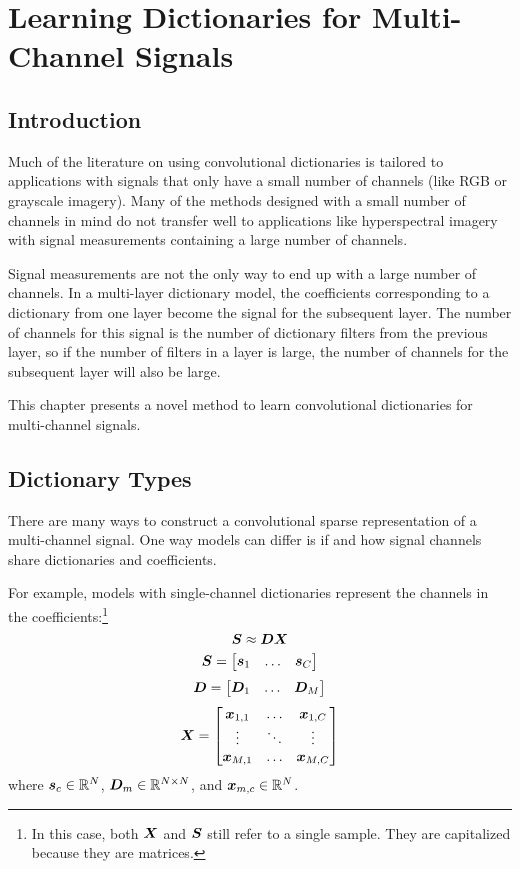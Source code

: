 \chapter{Learning Dictionaries for Multi-Channel Signals}

\section{Introduction}
Much of the literature on using convolutional dictionaries is tailored to applications with signals that only have a small number of channels (like RGB or grayscale imagery). Many of the methods designed with a small number of channels in mind do not transfer well to applications like hyperspectral imagery \cite{PURR1947} with signal measurements containing a large number of channels.

Signal measurements are not the only way to end up with a large number of channels. In a multi-layer dictionary model, the coefficients corresponding to a dictionary from one layer become the signal for the subsequent layer.  The number of channels for this signal is the number of dictionary filters from the previous layer, so if the number of filters in a layer is large, the number of channels for the subsequent layer will also be large.

This chapter presents a novel method to learn convolutional dictionaries for multi-channel signals. 
\section{Dictionary Types}
There are many ways to construct a convolutional sparse representation of a multi-channel signal. One way models can differ is if and how signal channels share dictionaries and coefficients.

For example, models with single-channel dictionaries represent the channels in the coefficients:\footnote{In this case, both $\bm{X}$ and $\bm{S}$ still refer to a single sample. They are capitalized because they are matrices.}
%
\begin{equation}
\bm{S} \approx \bm{D}\bm{X}
\end{equation}
\begin{equation}
\bm{S} = \begin{bmatrix} \bm{s}_1 & \hdots & \bm{s}_C \end{bmatrix}
\end{equation}
\begin{equation}
\bm{D} = \begin{bmatrix} \bm{D}_1 & \hdots & \bm{D}_M \end{bmatrix}
\end{equation}
\begin{equation}
\bm{X} = \begin{bmatrix} \bm{x}_{1,1} & \hdots & \bm{x}_{1,C} \\ \vdots & \ddots & \vdots \\ \bm{x}_{M,1} & \hdots & \bm{x}_{M,C} \end{bmatrix}
\end{equation}
%
where $\bm{s}_c \in \mathbb{R}^N$, $\bm{D}_m \in \mathbb{R}^{N \times N}$, and $\bm{x}_{m,c} \in \mathbb{R}^N$.

